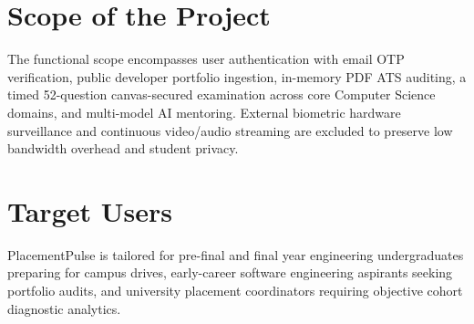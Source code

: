 \section{Scope of the Project}
The functional scope encompasses user authentication with email OTP verification, public developer portfolio ingestion, in-memory PDF ATS auditing, a timed 52-question canvas-secured examination across core Computer Science domains, and multi-model AI mentoring. External biometric hardware surveillance and continuous video/audio streaming are excluded to preserve low bandwidth overhead and student privacy.

\section{Target Users}
PlacementPulse is tailored for pre-final and final year engineering undergraduates preparing for campus drives, early-career software engineering aspirants seeking portfolio audits, and university placement coordinators requiring objective cohort diagnostic analytics.
